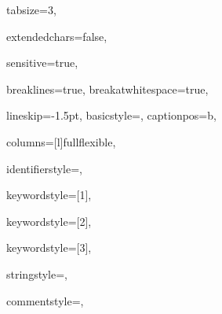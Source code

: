 {%
tabsize=3,

extendedchars=false,

sensitive=true,

breaklines=true,
breakatwhitespace=true,

lineskip={-1.5pt},
basicstyle={\ttfamily{}},%
captionpos=b,

columns=[l]fullflexible,


identifierstyle={\ttfamily\color{black}},

keywordstyle=[1]{\ttfamily\color{keywordcolor}},

keywordstyle=[2]{\ttfamily\color{sortcolor}},

keywordstyle=[3]{\ttfamily\color{errorcolor}},



stringstyle={\ttfamily\color{stringcolor}},

commentstyle={\ttfamily\itshape\color{commentcolor}},

}
